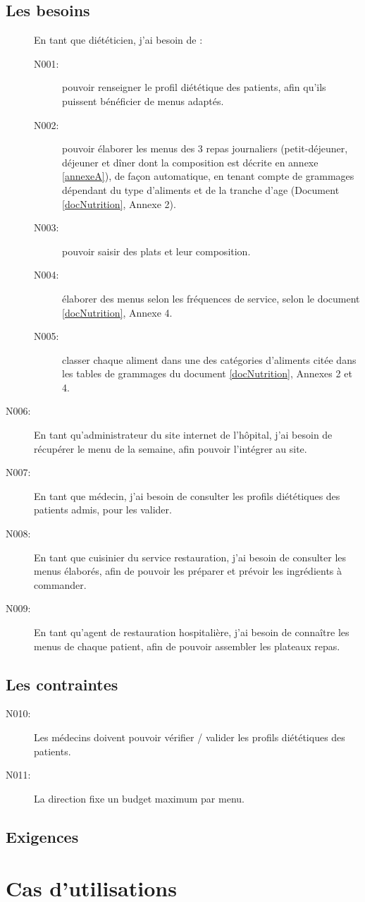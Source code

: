 \subsection{Les besoins}
\begin{description}
\item[] En tant que diététicien, j’ai besoin de :
\begin{description}
 \item[N001:] pouvoir renseigner le profil diététique des patients, afin qu’ils
 puissent bénéficier de menus adaptés.
 \item[N002:] pouvoir élaborer les menus des 3 repas journaliers
 (petit-déjeuner, déjeuner et dîner dont la composition est décrite en annexe
 \ref{annexeA}), de façon automatique, en tenant compte de grammages dépendant du type d'aliments et de la tranche d'age (Document \ref{docNutrition}, Annexe 2).
 \item[N003:] pouvoir saisir des plats et leur composition.
 \item[N004:] élaborer des menus selon les fréquences de service, selon le
 document \ref{docNutrition}, Annexe 4.
 \item[N005:] classer chaque aliment dans une des catégories d’aliments citée
 dans les tables de grammages du document \ref{docNutrition}, Annexes 2 et 4.
\end{description}
\item[N006:] En tant qu’administrateur du site internet de l’hôpital, j’ai
besoin de récupérer le menu de la semaine, afin pouvoir l’intégrer au site.
\item[N007:] En tant que médecin, j’ai besoin de consulter les profils
diététiques des patients admis, pour les  valider.
\item[N008:] En tant que cuisinier du service restauration, j’ai besoin de
consulter les menus élaborés, afin de pouvoir les préparer et prévoir les ingrédients à commander.
\item[N009:] En tant qu’agent de restauration hospitalière,  j’ai besoin de
connaître les menus de chaque patient, afin de pouvoir assembler les plateaux repas.
\end{description}
\subsection{Les contraintes}
\begin{description}
\item[N010:] Les médecins doivent pouvoir vérifier / valider les profils
diététiques des patients.
\item[N011:] La direction fixe un budget maximum par menu.
\end{description}

\subsection{Exigences}



\section{Cas d'utilisations}

